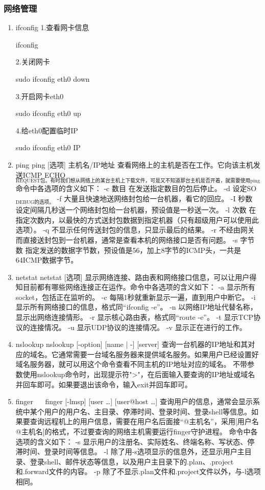\documentclass[11pt]{article}
\begin{document}
\subsubsection{网络管理}
\label{sec-1-1-11}
\begin{enumerate}
\item ifconfig
\label{sec-1-1-11-1}
1.查看网卡信息

ifconfig

2.关闭网卡

sudo ifconfig eth0 down

3.开启网卡eth0

sudo ifconfig eth0 up

4.给eth0配置临时IP

sudo ifconfig eth0 IP

\item ping
\label{sec-1-1-11-2}
ping [选项] 主机名/IP地址
查看网络上的主机是否在工作。它向该主机发送ICMP ECHO$_{\text{REQUEST包。有时我们想从网络上的某台主机上下载文件，可是又不知道那台主机是否开着，就需要使用ping命令查看。}}$ 
命令中各选项的含义如下： 
-c 数目 在发送指定数目的包后停止。 
-d 设定SO$_{\text{DEBUG的选项。}}$ 
-f 大量且快速地送网络封包给一台机器，看它的回应。 
-I 秒数 设定间隔几秒送一个网络封包给一台机器，预设值是一秒送一次。 
-l 次数 在指定次数内，以最快的方式送封包数据到指定机器（只有超级用户可以使用此选项）。 
-q 不显示任何传送封包的信息，只显示最后的结果。 
-r 不经由网关而直接送封包到一台机器，通常是查看本机的网络接口是否有问题。 
-s 字节数 指定发送的数据字节数，预设值是56，加上8字节的ICMP头，一共是64ICMP数据字节。 
\item netstat
\label{sec-1-1-11-3}
netstat [选项]
显示网络连接、路由表和网络接口信息，可以让用户得知目前都有哪些网络连接正在运作。命令中各选项的含义如下： 
-a 显示所有socket，包括正在监听的。 
-c 每隔1秒就重新显示一遍，直到用户中断它。 
-i 显示所有网络接口的信息，格式同“ifconfig -e”。 
-n 以网络IP地址代替名称，显示出网络连接情形。 
-r 显示核心路由表，格式同“route -e”。 
-t 显示TCP协议的连接情况。 
-u 显示UDP协议的连接情况。 
-v 显示正在进行的工作。 
\item nslookup
\label{sec-1-1-11-4}
nslookup [-option] [name | -] [server]
查询一台机器的IP地址和其对应的域名。它通常需要一台域名服务器来提供域名服务。如果用户已经设置好域名服务器，就可以用这个命令查看不同主机的IP地址对应的域名。 
不带参数使用nslookup命令时，出现提示符">"，在后面输入要查询的IP地址或域名并回车即可。如果要退出该命令，输入exit并回车即可。 
\item finger
\label{sec-1-1-11-5}
　 finger [-lmsp] [user \ldots{}] [user@host \ldots{}]
查询用户的信息，通常会显示系统中某个用户的用户名、主目录、停滞时间、登录时间、登录shell等信息。如果要查询远程机上的用户信息，需要在用户名后面接“@主机名”，采用[用户名@主机名]的格式，不过要查询的网络主机需要运行finger守护进程。 
命令中各选项的含义如下： 
-s 显示用户的注册名、实际姓名、终端名称、写状态、停滞时间、登录时间等信息。 
-l 除了用-s选项显示的信息外，还显示用户主目录、登录shell、邮件状态等信息，以及用户主目录下的.plan、.project和.forward文件的内容。 
-p 除了不显示.plan文件和.project文件以外，与-l选项相同。
\end{enumerate}
\end{document}
